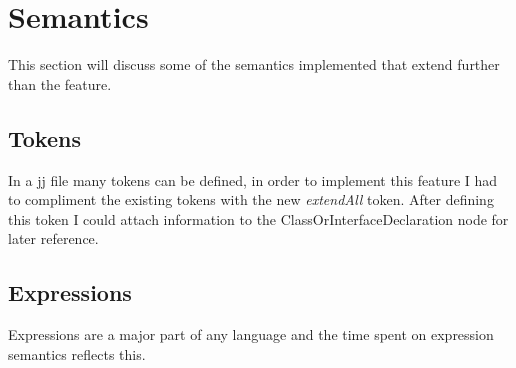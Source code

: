 \documentclass[twocolumn]{article} 	%
\begin{document}
\section{Semantics}
This section will discuss some of the semantics implemented that extend further than the feature.
\subsection{Tokens}
In a jj file many tokens can be defined, in order to implement this feature I had to compliment the existing tokens with the new \emph{extendAll}  token. After defining this token I could attach information to the ClassOrInterfaceDeclaration node for later reference.
\subsection{Expressions}
Expressions are a major part of any language and the time spent on expression semantics reflects this. 





\end{document}
